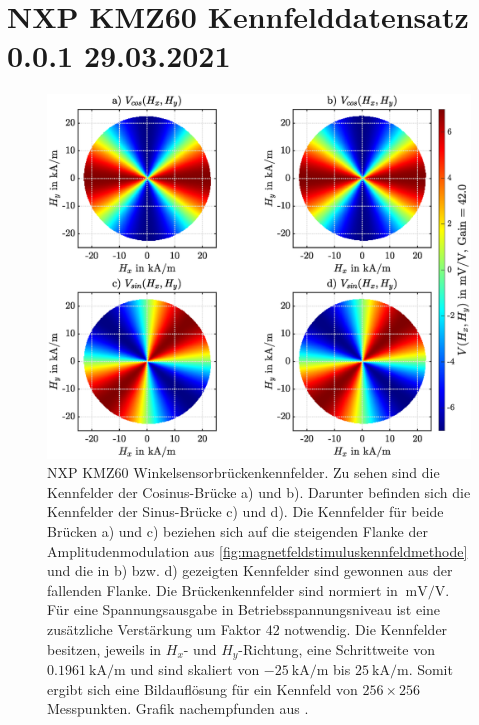 %

\chapter{NXP KMZ60 Kennfelddatensatz 0.0.1 29.03.2021}\label{ch:kmz60-datensatz}


\begin{figure}[tbph]
	\centering
	\includegraphics[width=\linewidth]{appendix/images/4-KMZ60/KMZ60_Kennfelder}
	\caption[NXP KMZ60 Winkelsensorbrückenkennfelder]{NXP KMZ60 Winkelsensorbrückenkennfelder. Zu sehen sind die 
		Kennfelder der Cosinus-Brücke a) und b). Darunter befinden sich die Kennfelder der Sinus-Brücke c) und d). 
		Die Kennfelder für beide Brücken a) und c) beziehen sich auf die steigenden Flanke der Amplitudenmodulation aus 
		\autoref{fig:magnetfeldstimuluskennfeldmethode} und die in b) bzw. d) gezeigten Kennfelder sind gewonnen aus 
		der fallenden Flanke. Die Brückenkennfelder sind normiert in $\SI{}{\milli\volt\per\volt}$. Für eine 
		Spannungsausgabe in Betriebsspannungsniveau ist eine zusätzliche Verstärkung um Faktor $42$ notwendig. Die 
		Kennfelder besitzen, jeweils in $H_x$- und $H_y$-Richtung, eine Schrittweite von 
		$\SI{0.1961}{\kilo\ampere\per\metre}$ und sind skaliert von $\SI{-25}{\kilo\ampere\per\metre}$ bis 
		$\SI{+25}{\kilo\ampere\per\metre}$. Somit ergibt sich eine Bildauflösung für ein Kennfeld von $256 \times 256$ 
		Messpunkten. Grafik nachempfunden aus \cite{Schuethe2019}.}
	\label{fig:kmz60kennfelder}
\end{figure}


